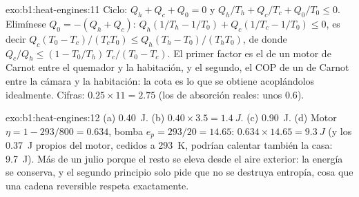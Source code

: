 \begin{solution}{exo:b1:heat-engines:11}
Ciclo: $Q_h + Q_c + Q_0 = 0$ y $Q_h/T_h + Q_c/T_c + Q_0/T_0 \leq 0$.
Elimínese $Q_0 = -(Q_h + Q_c)$: $Q_h(1/T_h - 1/T_0) + Q_c(1/T_c - 1/T_0) \leq 0$,
es decir $Q_c(T_0 - T_c)/(T_cT_0) \leq Q_h(T_h - T_0)/(T_hT_0)$, de donde
$Q_c/Q_h \leq (1 - T_0/T_h)\,T_c/(T_0 - T_c)$. El primer factor es el
 de un motor de Carnot entre el quemador y la habitación, y el
segundo, el COP de un  de Carnot entre la cámara y la
habitación: la cota es lo que se obtiene acoplándolos idealmente. Cifras: $0.25 \times 11 = 2.75$
(los  de absorción reales: unos $0.6$).
\end{solution}

\begin{solution}{exo:b1:heat-engines:12}
(a) \qty{0.40}{J}. (b) $0.40 \times 3.5 = \qty{1.4}{J}$. (c) \qty{0.90}{J}.
(d) Motor $\eta = 1 - 293/800 = 0.634$, bomba $e_p = 293/20 = 14.65$:
$0.634 \times 14.65 = \qty{9.3}{J}$ (y los \qty{0.37}{J} propios del motor,
cedidos a \qty{293}{K}, podrían calentar también la casa: \qty{9.7}{J}). Más de
un julio porque el resto se eleva desde el aire exterior: la energía se
conserva, y el segundo principio solo pide que no se destruya entropía,
cosa que una cadena reversible respeta exactamente.
\end{solution}

